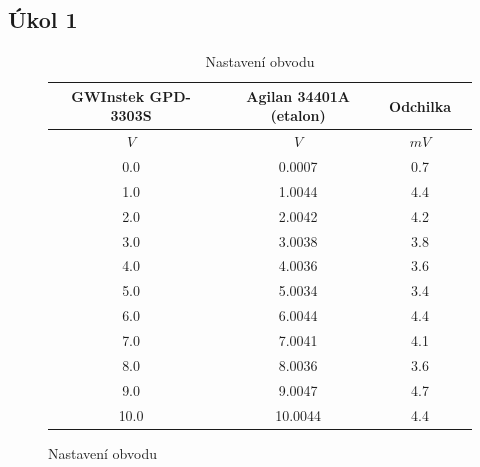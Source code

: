 \documentclass{article}
\begin{document}
\subsection{Úkol 1}
\begin{figure}[H]
    \begin{minipage}[t]{0.4\textwidth}
        \begin{table}[H]
            \vspace{-70mm}
            \begin{tabular}{|c|c|c|c|}
            \hline
                GWInstek GPD-3303S &	Agilan 34401A (etalon) &	Odchilka   \\ \hline
                \(V\)              &    \(V\)                  &	\(mV\)     \\ \hline
                 0.0               &    0.0007	               &    0.7        \\ \hline
                 1.0               &    1.0044	               &    4.4        \\ \hline
                 2.0               &    2.0042	               &    4.2        \\ \hline
                 3.0               &    3.0038	               &    3.8        \\ \hline
                 4.0               &    4.0036	               &    3.6        \\ \hline
                 5.0               &    5.0034	               &    3.4        \\ \hline
                 6.0               &    6.0044	               &    4.4        \\ \hline
                 7.0               &    7.0041	               &    4.1        \\ \hline
                 8.0               &    8.0036	               &    3.6        \\ \hline
                 9.0               &    9.0047	               &    4.7        \\ \hline
                10.0               &    10.0044                &	4.4        \\ \hline
            \end{tabular}
            \caption{\label{tab_pracovni_bod} Nastavení obvodu}
        \end{table}
    \end{minipage}
    \hfill
    \begin{minipage}[t]{0.4\textwidth}
\end{minipage}
\end{figure}
\end{document}
